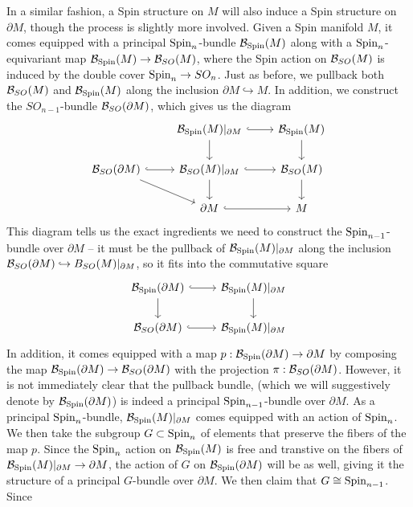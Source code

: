 In a similar fashion, a Spin structure on $M$ will also induce a Spin structure
on $\partial M$, though the process is slightly more involved. Given a Spin
manifold $M$, it comes equipped with a principal $\mathrm{Spin}_n$-bundle $\mathcal{B}_{\mathrm{Spin}}(M)$
along with a $\mathrm{Spin}_n$-equivariant map $\mathcal{B}_{\mathrm{Spin}}(M) \to \mathcal{B}_{SO}(M)$, where
the Spin action on $\mathcal{B}_{SO}(M)$ is induced by the double cover $\mathrm{Spin}_n \to SO_n$.
Just as before, we pullback both $\mathcal{B}_{SO}(M)$ and $\mathcal{B}_{\mathrm{Spin}}(M)$ along
the inclusion $\partial M \hookrightarrow M$. In addition, we construct the
$SO_{n-1}$-bundle $\mathcal{B}_{SO}(\partial M)$, which gives us the diagram
\[\begin{tikzcd}
&\B_{\Spin}(M)\vert_{\partial M} \ar[r, hookrightarrow]\ar[d] & \B_{\Spin}(M) \ar[d] \\
\B_{SO}(\partial M) \ar[r, hookrightarrow] \ar[dr] &\B_{SO}(M)\vert_{\partial M}
\ar[d] \ar[r, hookrightarrow] & \B_{SO}(M) \ar[d] \\
&\partial M \ar[r, hookrightarrow] & M
\end{tikzcd}\]
This diagram tells us the exact ingredients we need to construct the
$\mathrm{Spin}_{n-1}$-bundle over $\partial M$ -- it must be the pullback of
$\mathcal{B}_{\mathrm{Spin}}(M)\vert_{\partial M}$ along the inclusion
$\mathcal{B}_{SO}(\partial M) \hookrightarrow B_{SO}(M)\vert_{\partial M}$, so it fits
into the commutative square
\[\begin{tikzcd}
\B_{\Spin}(\partial M) \ar[d] \ar[r, hookrightarrow] &
\B_{\Spin}(M)\vert_{\partial M}\ar[d] \\
\B_{SO}(\partial M) \ar[r, hookrightarrow] & \B_{\Spin}(M)\vert_{\partial M}
\end{tikzcd}\]
In addition, it comes equipped with a map $p : \mathcal{B}_{\mathrm{Spin}}(\partial M) \to \partial M$
by composing the map $\mathcal{B}_{\mathrm{Spin}}(\partial M) \to \mathcal{B}_{SO}(\partial M)$ with the projection
$\pi : \mathcal{B}_{SO}(\partial M)$. However, it is not immediately clear that the pullback
bundle, (which we will suggestively denote by $\mathcal{B}_{\mathrm{Spin}}(\partial M)$) is
indeed a principal $\mathrm{Spin}_{n-1}$-bundle over $\partial M$. As a principal
$\mathrm{Spin}_n$-bundle, $\mathcal{B}_{\mathrm{Spin}}(M)\vert_{\partial M}$ comes equipped with an
action of $\mathrm{Spin}_n$. We then take the subgroup $G \subset \mathrm{Spin}_n$ of elements
that preserve the fibers of the map $p$. Since the $\mathrm{Spin}_n$ action on
$\mathcal{B}_{\mathrm{Spin}}(M)$ is free and transtive on the fibers of
$\mathcal{B}_{\mathrm{Spin}}(M)\vert_{\partial M} \to \partial M$, the action of $G$ on
$\mathcal{B}_{\mathrm{Spin}}(\partial M)$ will be as well, giving it the structure of a principal
$G$-bundle over $\partial M$. We then claim that $G \cong \mathrm{Spin}_{n-1}$. Since
